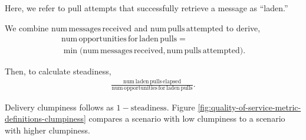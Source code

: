 Here, we refer to pull attempts that successfully retrieve a message as ``laden.''

We combine $\mathrm{num\,messages\,received}$ and $\mathrm{num\,pulls\,attempted}$ to derive,
\begin{align*}
  \mathrm{num\,opportunities\,for\,laden\,pulls} = \\
   \min\Big(\mathrm{num\,messages\,received}, \mathrm{num\,pulls\,attempted}\Big).
\end{align*}

Then, to calculate steadiness,
\begin{align*}
  \frac{
    \mathrm{num\,laden\,pulls\,elapsed}
  }{
    \mathrm{num\,opportunities\,for\,laden\,pulls}
  }.
\end{align*}

Delivery clumpiness follows as $1 - \mathrm{steadiness}$.
Figure \ref{fig:quality-of-service-metric-definitions-clumpiness} compares a scenario with low clumpiness to a scenario with higher clumpiness.
